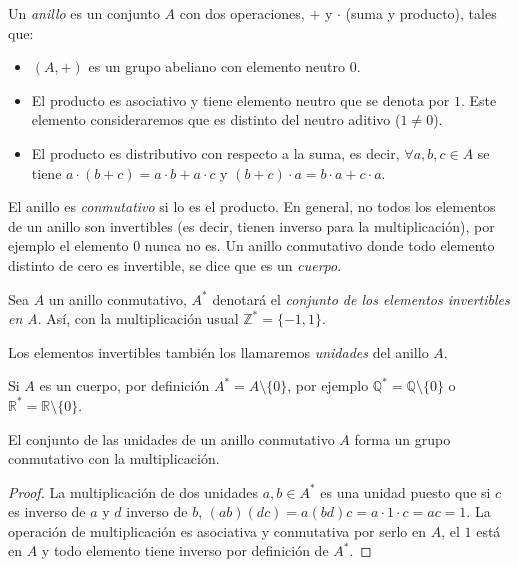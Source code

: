\begin{definition}
	Un \textit{anillo} es un conjunto $A$ con dos operaciones, $+$ y $\cdot$ (suma y producto), tales que:
	\begin{itemize}
		\item $(A,+)$ es un grupo abeliano con elemento neutro $0$.
		\item El producto es asociativo y tiene elemento neutro que
se denota por $1$. Este elemento consideraremos que es distinto del neutro aditivo ($1\neq 0$).
		\item El producto es distributivo con respecto a la suma, es decir,
$\forall a,b,c \in A$ se tiene $a\cdot(b+c)=a\cdot b + a\cdot c$ y $(b+c)\cdot a = b\cdot a + c\cdot a$.
	\end{itemize}

El anillo es \textit{conmutativo} si lo es el producto. En general, no todos los
elementos de un anillo son invertibles (es decir, tienen inverso para la multiplicaci\'on),
por ejemplo el elemento $0$ nunca no es. Un anillo conmutativo donde todo elemento
distinto de cero es invertible, se dice que es un \textit{cuerpo}.
\end{definition}

\begin{definition}
Sea $A$ un anillo conmutativo, $A^*$ denotará el
{\em conjunto de los elementos invertibles en A}. Así, con la
multiplicación usual $\mathbb{Z}^* = \{-1,1\}$.

Los elementos invertibles tambi\'en los llamaremos {\em unidades} del anillo $A$.

Si $A$ es un cuerpo, por definici\'on $A^* = A \setminus \{0\}$, por ejemplo
${\mathbb Q}^* = {\mathbb Q} \setminus \{0\}$ o ${\mathbb R}^* = {\mathbb R}\setminus \{0\}$.
\end{definition}

\begin{proposition}
El conjunto de las unidades de un anillo conmutativo $A$ forma un grupo
conmutativo con la multiplicaci\'on.
\end{proposition}
\begin{proof}
La multiplicaci\'on de dos unidades $a,b \in A^*$ es una unidad puesto que
si $c$ es inverso de $a$ y $d$ inverso de $b$, $(ab)(dc) = a(bd)c = a\cdot
1\cdot c = ac = 1$. La operaci\'on de multiplicaci\'on es asociativa y
conmutativa por serlo en $A$, el $1$ est\'a en $A$ y todo elemento tiene inverso por
definici\'on de $A^*$.
\end{proof}


